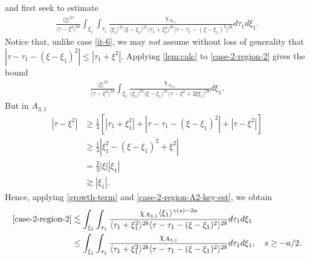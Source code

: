 \documentclass[12pt,reqno]{amsart}
\numberwithin{equation}{section}  %
\begin{document}
and first seek to estimate
%
%
\begin{equation}
  \label{case-2-region-2}
  \begin{split}
    \frac{ \langle \xi
    \rangle ^{2s}}{\langle \tau - \xi^{2} \rangle ^{2a}}
    \int_{\xi_{1}} \int_{\tau_{1}} \frac{\chi_{A_{3,1}}}{ \langle \xi_{1} \rangle ^{2s} \langle \xi-\xi_{1} \rangle ^{2s} 
    \langle \tau_{1} + \xi_{1}^{2} \rangle^{2b} \langle  \tau - \tau_{1} -
    (\xi - \xi_{1})^{2} \rangle^{2b} }
    d \tau_1 d \xi_{1}.
  \end{split}
\end{equation}
Notice that, unlike case \eqref{it-6}, we may \emph{not} assume without loss of generality
that $|\tau - \tau_{1} - (\xi - \xi_1)^{2} | \le | \tau_{1} + \xi^{2} | $.
Applying \cref{lem:calc} to \eqref{case-2-region-2} gives the bound
%
%
\begin{equation*}
  \begin{split}
    \frac{ \langle \xi
    \rangle ^{2s}}{\langle \tau - \xi^{2} \rangle ^{2a}}
    \int_{\xi_{1}} \frac{\chi_{A_{3,1}}}{ \langle \xi_{1} \rangle ^{2s} \langle \xi-\xi_{1} \rangle ^{2s} 
    \langle \tau - \xi^{2} +2 \xi \xi_{1} \rangle^{2b} } d \xi_{1}.
  \end{split}
\end{equation*}
%
%
%
But in $A_{3,1}$
%
%
\begin{equation}
\begin{split}
  | \tau - \xi^{2} |
  & \ge \frac{1}{3} \left[ | \tau_{1} + \xi_{1}^{2} | + | \tau - \tau_{1} -
  (\xi - \xi_{1})^{2} | + | \tau - \xi^{2} | \right]
  \\
  & \ge \frac{1}{3} | \xi_{1}^{2} - (\xi - \xi_{1})^{2} + \xi^{2} |
  \\
  & = \frac{2}{3}| \xi | | \xi_{1} |
  \\
  & \gtrsim  | \xi_{1} |.
\end{split}
\label{case-2-region-A2-key-est}
\end{equation}
%
%
Hence, applying \eqref{growth-term} and \eqref{case-2-region-A2-key-est}, we obtain
%
%
%
%
\begin{equation*}
\begin{split}
  \eqref{case-2-region-2}
  & \lesssim 
  \int_{\xi_{1}} \int_{\tau_{1}} \frac{\chi_{A_{3,1}} \langle \xi_{1}
  \rangle^{\gamma(s) -2a}}{  
    \langle \tau_{1} + \xi_{1}^{2} \rangle^{2b} \langle  \tau - \tau_{1} -
    (\xi - \xi_{1})^{2} \rangle^{2b} }
    d \tau_1 d \xi_{1}
    \\
    & \le \int_{\xi_{1}} \int_{\tau_{1}} \frac{\chi_{A_{3,1}}}{  
    \langle \tau_{1} + \xi_{1}^{2} \rangle^{2b} \langle  \tau - \tau_{1} -
    (\xi - \xi_{1})^{2} \rangle^{2b} }
    d \tau_1 d \xi_{1}, \quad s \ge -a/2.
\end{split}
\end{equation*}
\end{document}
